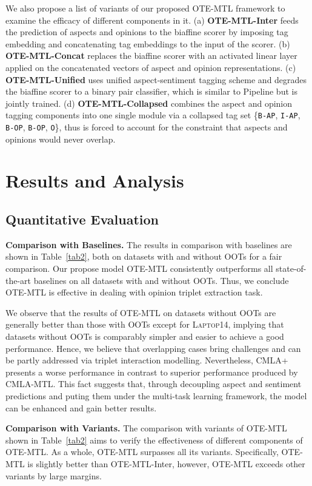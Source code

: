 \documentclass[11pt,a4paper]{article}
\begin{document}
We also propose a list of variants of our proposed OTE-MTL framework to examine the efficacy of different components in it. (a) \textbf{OTE-MTL-Inter} feeds the prediction of aspects and opinions to the biaffine scorer by imposing tag embedding and concatenating tag embeddings to the input of the scorer. (b) \textbf{OTE-MTL-Concat} replaces the biaffine scorer with an activated linear layer applied on the concatenated vectors of aspect and opinion representations. (c) \textbf{OTE-MTL-Unified} uses unified aspect-sentiment tagging scheme and degrades the biaffine scorer to a binary pair classifier, which is similar to Pipeline but is jointly trained. (d) \textbf{OTE-MTL-Collapsed} combines the aspect and opinion tagging components into one single module via a collapsed tag set \{\texttt{B-AP}, \texttt{I-AP}, \texttt{B-OP}, \texttt{B-OP}, \texttt{O}\}, thus is forced to account for the constraint that aspects and opinions would never overlap. \section{Results and Analysis}

\subsection{Quantitative Evaluation}

\noindent \textbf{Comparison with Baselines.} The results in comparison with baselines are shown in Table~\ref{tab2}, both on datasets with and without OOTs for a fair comparison. Our propose model OTE-MTL consistently outperforms all state-of-the-art baselines on all datasets with and without OOTs. Thus, we conclude OTE-MTL is effective in dealing with opinion triplet extraction task.

We observe that the results of OTE-MTL on datasets without OOTs are generally better than those with OOTs except for \textsc{Laptop14}, implying that datasets without OOTs is comparably simpler and easier to achieve a good performance. Hence, we believe that overlapping cases bring challenges and can be partly addressed via triplet interaction modelling. Nevertheless, CMLA+ presents a worse performance in contrast to superior performance produced by CMLA-MTL. This fact suggests that, through decoupling aspect and sentiment predictions and puting them under the multi-task learning framework, the model can be enhanced and gain better results.     

\noindent \textbf{Comparison with Variants.} The comparison with variants of OTE-MTL shown in Table~\ref{tab2} aims to verify the effectiveness of different components of OTE-MTL. As a whole, OTE-MTL surpasses all its variants. Specifically, OTE-MTL is slightly better than OTE-MTL-Inter, however, OTE-MTL exceeds other variants by large margins. 
\end{document}
